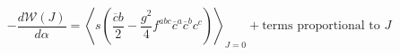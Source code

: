 \begin{equation}  \label{24}
-\frac{d\mathcal{W}(J)}{d\alpha}=\left\langle s\left(\frac{\overline{c}b}{2}-%
\frac{g^{2}}{4}f^{abc}\overline{c}^{a}\overline{c}^{b}c^{c}\right)\right%
\rangle_{J=0}+\textrm{terms proportional to } J
\end{equation}

